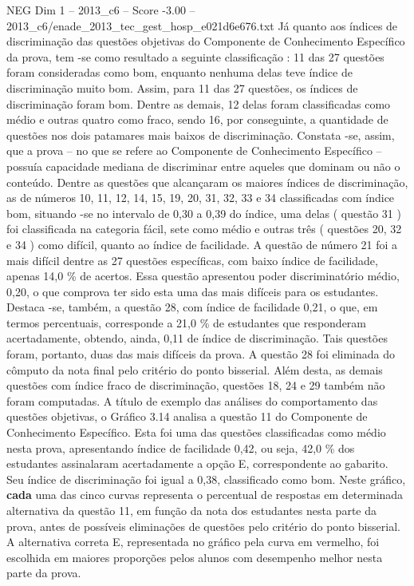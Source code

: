 \begin{textsample}{NEG Dim 1 – 2013\_c6 – Score -3.00 – 2013\_c6/enade\_2013\_tec\_gest\_hosp\_e021d6e676.txt}
Já quanto aos índices de discriminação das questões objetivas do Componente de Conhecimento Específico da prova, tem -se como resultado a seguinte classificação : 11 das 27 questões foram consideradas como bom, enquanto nenhuma delas teve índice de discriminação muito bom.
Assim, para 11 das 27 questões, os índices de discriminação foram bom.
Dentre as demais, 12 delas foram classificadas como médio e outras quatro como fraco, sendo 16, por conseguinte, a quantidade de questões nos dois patamares mais baixos de discriminação.
Constata -se, assim, que a prova – no que se refere ao Componente de Conhecimento Específico – possuía capacidade mediana de discriminar entre aqueles que dominam ou não o conteúdo.
Dentre as questões que alcançaram os maiores índices de discriminação, as de números 10, 11, 12, 14, 15, 19, 20, 31, 32, 33 e 34 classificadas com índice bom, situando -se no intervalo de 0,30 a 0,39 do índice, uma delas ( questão 31 ) foi classificada na categoria fácil, sete como médio e outras três ( questões 20, 32 e 34 ) como difícil, quanto ao índice de facilidade.
A questão de número 21 foi a mais difícil dentre as 27 questões específicas, com baixo índice de facilidade, apenas 14,0 \% de acertos.
Essa questão apresentou poder discriminatório médio, 0,20, o que comprova ter sido esta uma das mais difíceis para os estudantes.
Destaca -se, também, a questão 28, com índice de facilidade 0,21, o que, em termos percentuais, corresponde a 21,0 \% de estudantes que responderam acertadamente, obtendo, ainda, 0,11 de índice de discriminação.
Tais questões foram, portanto, duas das mais difíceis da prova.
A questão 28 foi eliminada do cômputo da nota final pelo critério do ponto bisserial.
Além desta, as demais questões com índice fraco de discriminação, questões 18, 24 e 29 também não foram computadas.
A título de exemplo das análises do comportamento das questões objetivas, o Gráfico 3.14 analisa a questão 11 do Componente de Conhecimento Específico.
Esta foi uma das questões classificadas como médio nesta prova, apresentando índice de facilidade 0,42, ou seja, 42,0 \% dos estudantes assinalaram acertadamente a opção E, correspondente ao gabarito.
Seu índice de discriminação foi igual a 0,38, classificado como bom.
Neste gráfico, \textbf{cada} uma das cinco curvas representa o percentual de respostas em determinada alternativa da questão 11, em função da nota dos estudantes nesta parte da prova, antes de possíveis eliminações de questões pelo critério do ponto bisserial.
A alternativa correta E, representada no gráfico pela curva em vermelho, foi escolhida em maiores proporções pelos alunos com desempenho melhor nesta parte da prova.

\end{textsample}
